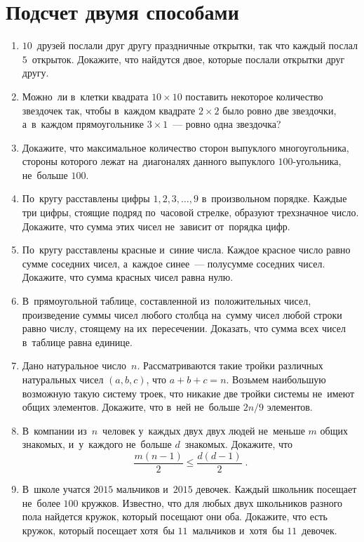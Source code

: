 
\section*{Подсчет двумя способами}


\begin{enumerate}

\item
$10$~друзей послали друг другу праздничные открытки, так что каждый послал
$5$~открыток.
Докажите, что найдутся двое, которые послали открытки друг другу.

\item
Можно~ли в~клетки квадрата $10 \times 10$ поставить некоторое количество
звездочек так, чтобы в~каждом квадрате $2 \times 2$ было ровно две звездочки,
а~в~каждом прямоугольнике $3 \times 1$~--- ровно одна звездочка?

\item
Докажите, что максимальное количество сторон выпуклого многоугольника, стороны
которого лежат на~диагоналях данного выпуклого $100$-угольника, не~больше
$100$.

\item
По~кругу расставлены цифры $1, 2, 3,\ldots, 9$ в~произвольном порядке.
Каждые три цифры, стоящие подряд по~часовой стрелке, образуют трехзначное
число.
Докажите, что сумма этих чисел не~зависит от~порядка цифр.

\item
По~кругу расставлены красные и~синие числа.
Каждое красное число равно сумме соседних чисел, а~каждое синее~--- полусумме
соседних чисел.
Докажите, что сумма красных чисел равна нулю.

\item
В~прямоугольной таблице, составленной из~положительных чисел, произведение
суммы чисел любого столбца на~сумму чисел любой строки равно числу, стоящему
на их~пересечении.
Доказать, что сумма всех чисел в~таблице равна единице.

\item
Дано натуральное число~$n$.
Рассматриваются такие тройки различных натуральных чисел $(a, b, c)$, что
$a + b + c = n$.
Возьмем наибольшую возможную такую систему троек, что никакие две тройки
системы не~имеют общих элементов.
Докажите, что в~ней не~больше $2 n / 9$ элементов.

\item
В~компании из~$n$~человек у~каждых двух двух людей не~меньше $m$ общих
знакомых, и~у~каждого не~больше $d$~знакомых.
Докажите, что
\[
    \frac{m (n - 1)}{2}
\leq
    \frac{d (d - 1)}{2}
\;.\]

\item
В~школе учатся $2015$ мальчиков и~$2015$ девочек.
Каждый школьник посещает не~более $100$ кружков.
Известно, что для любых двух школьников разного пола найдется кружок, который
посещают они оба.
Докажите, что есть кружок, который посещает хотя~бы $11$~мальчиков и~хотя~бы
$11$~девочек.

\end{enumerate}

